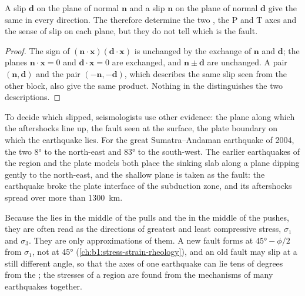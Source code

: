 \begin{proposition}\label{prop:b1:earthquake-source:auxiliary}
A slip $\mathbf d$ on the plane of normal $\mathbf n$ and a slip $\mathbf n$ on
the plane of normal $\mathbf d$ give the same  in every direction.
The  therefore determine the two , the P and T axes and
the sense of slip on each plane, but they do not tell which  is the
fault.
\end{proposition}

\begin{proof}
The sign of $(\mathbf n\cdot\mathbf x)(\mathbf d\cdot\mathbf x)$ is unchanged
by the exchange of $\mathbf n$ and $\mathbf d$; the planes
$\mathbf n\cdot\mathbf x = 0$ and $\mathbf d\cdot\mathbf x = 0$ are exchanged,
and $\mathbf n \pm \mathbf d$ are unchanged. A pair $(\mathbf n, \mathbf d)$ and
the pair $(-\mathbf n, -\mathbf d)$, which describes the same slip seen from the
other block, also give the same product. Nothing in the 
distinguishes the two descriptions.
\end{proof}

To decide which  slipped, seismologists use other evidence: the
plane along which the aftershocks line up, the fault seen at the surface, the
plate boundary on which the earthquake lies. For the great Sumatra--Andaman
earthquake of 2004, the two   \ang{8} to the north-east and
\ang{83} to the south-west. The earlier earthquakes of the region and the
plate models both place the sinking slab along a plane dipping gently to the
north-east, and the shallow plane is taken as the fault: the earthquake broke
the plate interface of the subduction zone, and its aftershocks spread over
more than \qty{1300}{km}.

Because the  lies in the middle of the pulls and the  in the middle
of the pushes, they are often read as the directions of greatest and least
compressive stress, $\sigma_1$ and $\sigma_3$. They are only approximations of
them. A new fault forms at $\ang{45} - \phi/2$ from $\sigma_1$, not at \ang{45}
(\cref{ch:b1:stress-strain-rheology}), and an old fault may slip at a still
different angle, so that the axes of one earthquake can lie tens of degrees from
the ; the stresses of a region are found from the mechanisms
of many earthquakes together.

